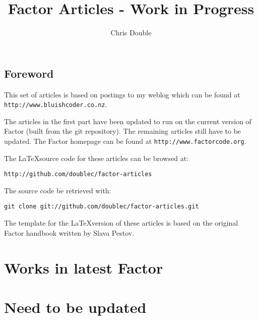 \documentclass{book}
\begin{document}
\title{Factor Articles - Work in Progress}

\author{Chris Double}

\maketitle
\tableofcontents{}

\chapter*{Foreword}

This set of articles is based on postings to my weblog which can be found at \verb|http://www.bluishcoder.co.nz|.

The articles in the first part have been updated to run on the current version of Factor (built from the git repository). The remaining articles still have to be updated. The Factor homepage can be found at \verb|http://www.factorcode.org|.

The \LaTeX source code for these articles can be browsed at:
\begin{verbatim}
http://github.com/doublec/factor-articles
\end{verbatim}

The source code be retrieved with:
\begin{verbatim}
git clone git://github.com/doublec/factor-articles.git
\end{verbatim}

The template for the \LaTeX version of these articles is based on the original Factor handbook written by Slava Pestov.

\part{Works in latest Factor}







\part{Need to be updated}















\end{document}
